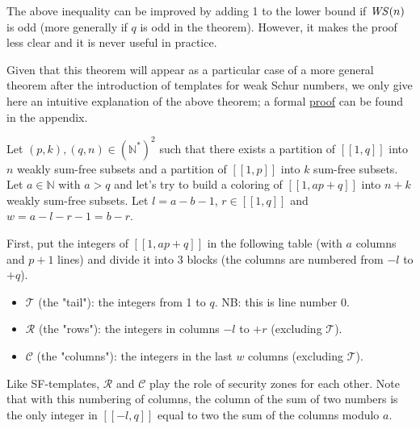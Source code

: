 \begin{remark}
The above inequality can be improved by adding 1 to the lower bound if \(\mathit{WS} (n)\) is odd (more generally if \(q\) is
odd in the theorem). However, it makes the proof less clear and it is never useful in practice.
\end{remark}

Given that this theorem will appear as a particular case of a more general theorem after the introduction of
templates for weak Schur numbers, we only give here an intuitive explanation of the above theorem; a formal
\hyperref[proof_theorem]{proof} can be found in the appendix.

Let \((p, k), (q, n) \in (\mathbb{N}^*)^2\) such that there exists a partition of \([\![1,q]\!]\) into \(n\) weakly sum-free
subsets and a partition of \([\![1,p]\!]\) into \(k\) sum-free subsets. Let \(a \in \mathbb{N}\) with \(a > q\)
and let's try to build a coloring of \([\![1, ap + q]\!]\) into \(n + k\) weakly sum-free subsets. Let
\(l = a - b - 1\), \(r \in [\![1,q]\!]\) and \(w = a - l - r - 1 = b - r\).

First, put the integers of \([\![1, ap + q]\!]\) in the following table (with \(a\) columns and \(p + 1\) lines) 
and divide it into 3 blocks (the columns are numbered from \(-l\) to \(+q\)).

\begin{itemize}
	\item \(\mathcal{T}\) (the "tail"): the integers from 1 to \(q\). NB: this is line number 0.
	\item \(\mathcal{R}\) (the "rows"): the integers in columns \(-l\) to \(+r\) (excluding  \(\mathcal{T}\)).
	\item \(\mathcal{C}\) (the "columns"): the integers in the last \(w\) columns (excluding  \(\mathcal{T}\)).
\end{itemize}

Like SF-templates, \(\mathcal{R}\) and \(\mathcal{C}\) play the role of security zones for each other. Note that with
this numbering of columns, the column of the sum of two numbers is the only integer in \([\![-l,q]\!]\) equal to two the
sum of the columns modulo \(a\).

\renewcommand{\arraystretch}{1.7}
\setlength{\arraycolsep}{4pt}

